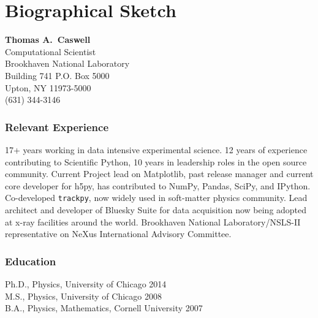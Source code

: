 \documentclass[12pt]{article}
\numberwithin{page}{section}
\begin{document}





\newpage
\section{Biographical Sketch}
\setcounter{page}{1}
\begin{center}
  \textbf{Thomas A.\ Caswell}\\
  Computational Scientist\\
  Brookhaven National Laboratory\\
  Building 741 P.O. Box 5000\\
  Upton, NY 11973-5000\\
  (631) 344-3146\\
\end{center}

\subsubsection*{Relevant Experience}
17+ years working in data intensive experimental science.  12 years of
experience contributing to Scientific Python, 10 years in leadership roles in
the open source community.  Current Project lead on Matplotlib, past release
manager and current core developer for h5py, has contributed to NumPy, Pandas,
SciPy, and IPython.  Co-developed \texttt{trackpy}, now widely used in
soft-matter physics community.  Lead architect and developer of Bluesky Suite
for data acquisition now being adopted at x-ray facilities around the world.
Brookhaven National Laboratory/NSLS-II representative on NeXus International
Advisory Committee.

\subsubsection*{Education}
Ph.D., Physics, University of Chicago \hfill 2014\\
M.S., Physics, University of Chicago \hfill 2008\\
B.A., Physics, Mathematics, Cornell University \hfill 2007
\end{document}
